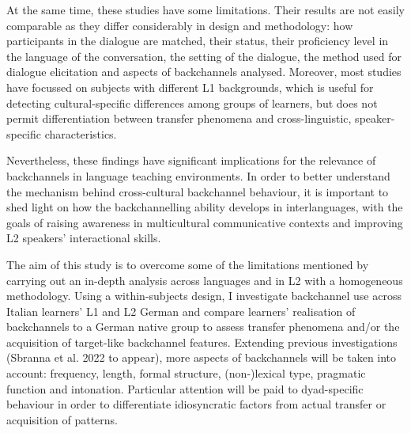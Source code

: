\begin{styleStandard}
At the same time, these studies have some limitations. Their results are not easily comparable as they differ considerably in design and methodology: how participants in the dialogue are matched, their status, their proficiency level in the language of the conversation, the setting of the dialogue, the method used for dialogue elicitation and aspects of backchannels analysed. Moreover, most studies have focussed on subjects with different L1 backgrounds, which is useful for detecting cultural-specific differences among groups of learners, but does not permit differentiation between transfer phenomena and cross-linguistic, speaker-specific characteristics.
\end{styleStandard}

\begin{styleStandard}
Nevertheless, these findings have significant implications for the relevance of backchannels in language teaching environments. In order to better understand the mechanism behind cross-cultural backchannel behaviour, it is important to shed light on how the backchannelling ability develops in interlanguages, with the goals of raising awareness in multicultural communicative contexts and improving L2 speakers’ interactional skills.
\end{styleStandard}

\begin{styleStandard}
The aim of this study is to overcome some of the limitations mentioned by carrying out an in-depth analysis across languages and in L2 with a homogeneous methodology. Using a within-subjects design, I investigate backchannel use across Italian learners’ L1 and L2 German and compare learners’ realisation of backchannels to a German native group to assess transfer phenomena and/or the acquisition of target-like backchannel features. Extending previous investigations (Sbranna et al. 2022 to appear), more aspects of backchannels will be taken into account: frequency, length, formal structure, (non-)lexical type, pragmatic function and intonation. Particular attention will be paid to dyad-specific behaviour in order to differentiate idiosyncratic factors from actual transfer or acquisition of patterns.
\end{styleStandard}

